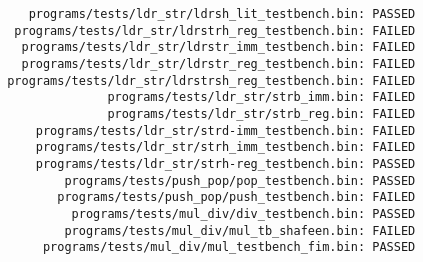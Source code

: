 \documentclass{article}
\begin{document}
\begin{verbatim}
    programs/tests/ldr_str/ldrsh_lit_testbench.bin: PASSED
  programs/tests/ldr_str/ldrstrh_reg_testbench.bin: FAILED
   programs/tests/ldr_str/ldrstr_imm_testbench.bin: FAILED
   programs/tests/ldr_str/ldrstr_reg_testbench.bin: FAILED
 programs/tests/ldr_str/ldrstrsh_reg_testbench.bin: FAILED
               programs/tests/ldr_str/strb_imm.bin: FAILED
               programs/tests/ldr_str/strb_reg.bin: FAILED
     programs/tests/ldr_str/strd-imm_testbench.bin: FAILED
     programs/tests/ldr_str/strh_imm_testbench.bin: FAILED
     programs/tests/ldr_str/strh-reg_testbench.bin: PASSED
         programs/tests/push_pop/pop_testbench.bin: PASSED
        programs/tests/push_pop/push_testbench.bin: FAILED
          programs/tests/mul_div/div_testbench.bin: PASSED
         programs/tests/mul_div/mul_tb_shafeen.bin: FAILED
      programs/tests/mul_div/mul_testbench_fim.bin: PASSED
\end{verbatim}
\end{document}
